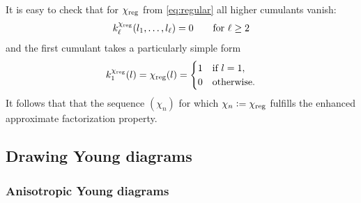 \documentclass[12pt,usenames,dvipsnames,svgnames,table]{amsart}
\begin{document}
\begin{example}
	\label{example:plancherel}
	It is easy to check that for $\chi_{\operatorname{reg}}$ from 
	\eqref{eq:regular} all higher cumulants vanish:
	\[ k^{\chi_{\operatorname{reg}}}_\ell (l_1,\dots,l_\ell) = 0 \qquad \text{for $\ell\geq 2$}\]
	and the first cumulant takes a particularly simple form
	\[ k^{\chi_{\operatorname{reg}}}_1 (l) = \chi_{\operatorname{reg}} (l) =
	\begin{cases} 
	1 & \text{if } l=1, \\ 
	0 & \text{otherwise.}
	\end{cases}
	\]
	It follows that that the sequence $(\chi_n)$ for which $\chi_n:=\chi_{\operatorname{reg}}$ fulfills the enhanced approximate
	factorization property.
\end{example}

\subsection{Drawing Young diagrams}
\subsubsection{Anisotropic Young diagrams}
\label{sec:anisotropic-young}
\end{document}
